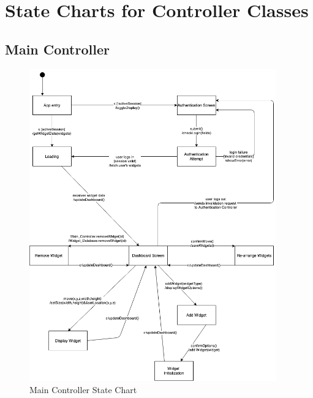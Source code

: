 \documentclass[]{article}
\begin{document}
\section{State Charts for Controller Classes}
\label{sec:state_charts_for_controller_classes}
\subsection{Main Controller}
\label{sub:main_controller_state}
\begin{figure}[H]
\begin{center}
\includegraphics[width=0.95\textwidth]{D3/images/MainController.png}
\end{center}
\caption{Main Controller State Chart}
\label{fig:Main Controller State Chart}
\end{figure}
\end{document}
